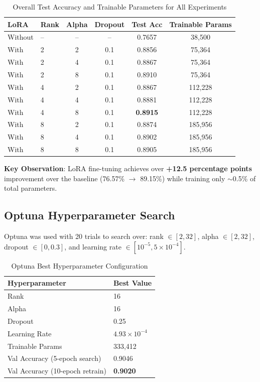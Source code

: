 \documentclass[12pt,a4paper]{article}
\begin{document}
\begin{table}[H]
\centering
\caption{Overall Test Accuracy and Trainable Parameters for All Experiments}
\begin{tabular}{llcccc}
\toprule
\textbf{LoRA} & \textbf{Rank} & \textbf{Alpha} & \textbf{Dropout} & \textbf{Test Acc} & \textbf{Trainable Params} \\
\midrule
Without & -- & -- & -- & 0.7657 & 38,500 \\
With & 2 & 2 & 0.1 & 0.8856 & 75,364 \\
With & 2 & 4 & 0.1 & 0.8867 & 75,364 \\
With & 2 & 8 & 0.1 & 0.8910 & 75,364 \\
With & 4 & 2 & 0.1 & 0.8867 & 112,228 \\
With & 4 & 4 & 0.1 & 0.8881 & 112,228 \\
With & 4 & 8 & 0.1 & \textbf{0.8915} & 112,228 \\
With & 8 & 2 & 0.1 & 0.8874 & 185,956 \\
With & 8 & 4 & 0.1 & 0.8902 & 185,956 \\
With & 8 & 8 & 0.1 & 0.8905 & 185,956 \\
\bottomrule
\end{tabular}
\end{table}

\textbf{Key Observation}: LoRA fine-tuning achieves over \textbf{+12.5 percentage points} improvement over the baseline (76.57\% $\to$ 89.15\%) while training only $\sim$0.5\% of total parameters.

\subsection{Optuna Hyperparameter Search}

Optuna was used with 20 trials to search over: rank $\in [2,32]$, alpha $\in [2,32]$, dropout $\in [0, 0.3]$, and learning rate $\in [10^{-5}, 5 \times 10^{-4}]$.

\begin{table}[H]
\centering
\caption{Optuna Best Hyperparameter Configuration}
\begin{tabular}{ll}
\toprule
\textbf{Hyperparameter} & \textbf{Best Value} \\
\midrule
Rank & 16 \\
Alpha & 16 \\
Dropout & 0.25 \\
Learning Rate & $4.93 \times 10^{-4}$ \\
Trainable Params & 333,412 \\
Val Accuracy (5-epoch search) & 0.9046 \\
Val Accuracy (10-epoch retrain) & \textbf{0.9020} \\
\bottomrule
\end{tabular}
\end{table}
\end{document}
